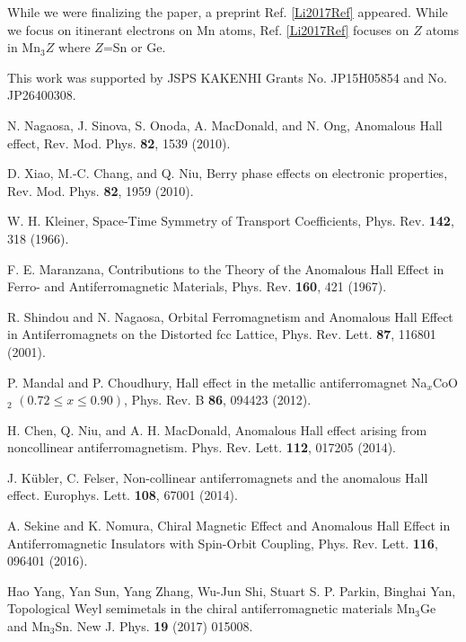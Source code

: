 \documentclass[letter,twocolumn,amsmath,amssymb,superscriptaddress]{jpsj3}
\begin{document}
While we were finalizing the paper, a preprint Ref. \ref{Li2017Ref} appeared. While we focus on itinerant electrons on Mn atoms, Ref. \ref{Li2017Ref} focuses on $Z$ atoms in Mn$_3Z$ where $Z$=Sn or Ge.



 This work was supported by JSPS KAKENHI Grants No. JP15H05854 and No. JP26400308.
 

\begin{thebibliography}{99}

N. Nagaosa, J. Sinova, S. Onoda, A. MacDonald, and N. Ong,
Anomalous Hall effect,
Rev. Mod. Phys. {\bf 82}, 1539 (2010).

D. Xiao, M.-C. Chang, and Q. Niu, 
Berry phase effects on electronic properties,
Rev. Mod. Phys. {\bf 82}, 1959 (2010).

W. H. Kleiner,
Space-Time Symmetry of Transport Coefficients,
Phys. Rev. {\bf 142}, 318 (1966).

F. E. Maranzana, 
Contributions to the Theory of the Anomalous Hall Effect in Ferro- and Antiferromagnetic Materials,
Phys. Rev. {\bf 160}, 421 (1967).

R. Shindou and N. Nagaosa,
Orbital Ferromagnetism and Anomalous Hall Effect in Antiferromagnets on the Distorted fcc Lattice,
Phys. Rev. Lett. {\bf 87}, 116801 (2001).

P. Mandal and P. Choudhury,
Hall effect in the metallic antiferromagnet 
Na$_x$CoO$_2$ $(0.72\le x\le 0.90)$,
Phys. Rev. B {\bf 86}, 094423 (2012).


H. Chen, Q. Niu, and A. H. MacDonald,
Anomalous Hall effect arising from noncollinear antiferromagnetism.
Phys. Rev. Lett. {\bf 112}, 017205 (2014).
\label{Chen2014Ref}

J. K\"ubler, C. Felser, Non-collinear antiferromagnets and the anomalous Hall effect. Europhys. Lett. {\bf 108}, 67001 (2014).

A. Sekine and K. Nomura,
Chiral Magnetic Effect and Anomalous Hall Effect in Antiferromagnetic Insulators with Spin-Orbit Coupling,
Phys. Rev. Lett. {\bf 116}, 096401 (2016).

Hao Yang, Yan Sun, Yang Zhang, Wu-Jun Shi, Stuart S. P. Parkin, Binghai Yan,
Topological Weyl semimetals in the chiral antiferromagnetic materials Mn$_3$Ge and Mn$_3$Sn.
New J. Phys. {\bf 19} (2017) 015008.


\end{thebibliography}
\end{document}
